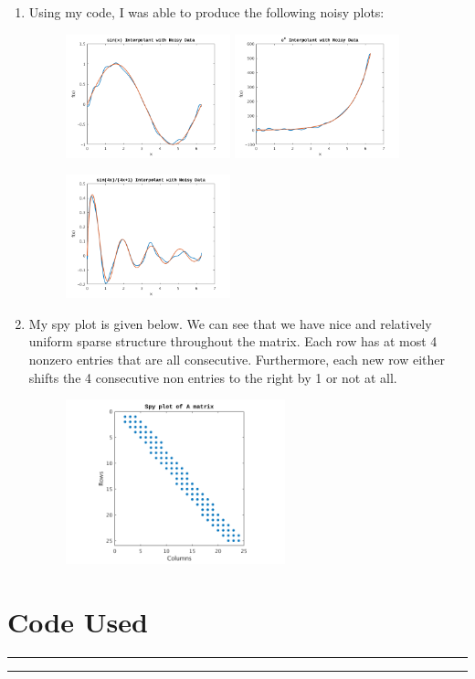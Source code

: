 \documentclass[a4paper,12pt]{article}
\begin{document}
\begin{enumerate}[label = \arabic*.]
\begin{enumerate}[label = (\roman*)]
			\item Using my code, I was able to produce the following noisy plots:
			\begin{figure}[h!]
				\centering
				\includegraphics[width = 0.45\textwidth]{images/sin.png}
				\includegraphics[width = 0.45\textwidth]{images/exp.png}
				
				\includegraphics[width = 0.45\textwidth]{images/sinc.png}
			\end{figure}
			
			\newpage
			\item My spy plot is given below. We can see that we have nice and relatively uniform sparse structure throughout the matrix. Each row has at most 4 nonzero entries that are all consecutive. Furthermore, each new row either shifts the 4 consecutive non entries to the right by 1 or not at all. 
			\begin{figure}[h!]
				\centering
				\includegraphics[width = 0.6\textwidth]{images/spy.png}
			\end{figure}
		\end{enumerate}
\end{enumerate}

\newpage
\section*{Code Used}
\rule{\textwidth}{0.4pt}
	
\rule{\textwidth}{0.4pt}
\end{document}
